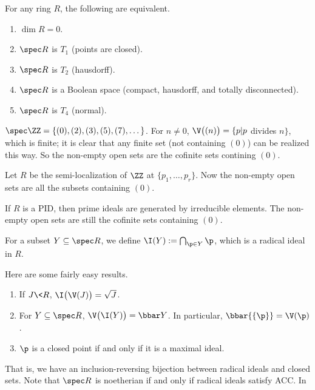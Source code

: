  \begin{proposition}
   For any ring $R$, the following are equivalent.
   \begin{enumerate}
     \item $\dim R=0$.
     \item $\spec R$ is $T_1$ (points are closed).
     \item $\spec R$ is $T_2$ (hausdorff).
     \item $\spec R$ is a Boolean space (compact, hausdorff, and totally disconnected).
     \item $\spec R$ is $T_4$ (normal).
   \end{enumerate}
 \end{proposition}
 \begin{example}
   $\spec \ZZ = \{(0),(2),(3),(5),(7),\dots\}$. For $n\neq 0$, $\V\bigl((n)\bigr) = \{p|
   p$ divides $n\}$, which is finite; it is clear that any finite set (not containing
   $(0)$) can be realized this way. So the non-empty open sets are the cofinite sets
   contining $(0)$.
 \end{example}
 \begin{example}
   Let $R$ be the semi-localization of $\ZZ$ at $\{p_1,\dots, p_r\}$. Now the non-empty
   open sets are all the subsets containing $(0)$.
 \end{example}
 \begin{example}
   If $R$ is a PID, then prime ideals are generated by irreducible elements. The
   non-empty open sets are still the cofinite sets containing $(0)$.
 \end{example}
 \begin{definition}
   For a subset $Y\subseteq \spec R$, we define $\I(Y):=\bigcap_{\p\in Y}\p$, which is a
   radical ideal in $R$.
 \end{definition}
 \begin{proposition}
   Here are some fairly easy results.
   \begin{enumerate}
     \item If $J\< R$, $\I\bigl(\V(J)\bigr) = \sqrt J$.
     \item For $Y\subseteq \spec R$, $\V\bigl(\I(Y)\bigr)=\bbar Y$. In particular,
     $\bbar{\{\p\}}=\V(\p)$.
     \item $\p$ is a closed point if and only if it is a maximal ideal.
   \end{enumerate}
 \end{proposition}
 That is, we have an inclusion-reversing bijection between radical ideals and closed
 sets. Note that $\spec R$ is noetherian if and only if radical ideals satisfy ACC. In
